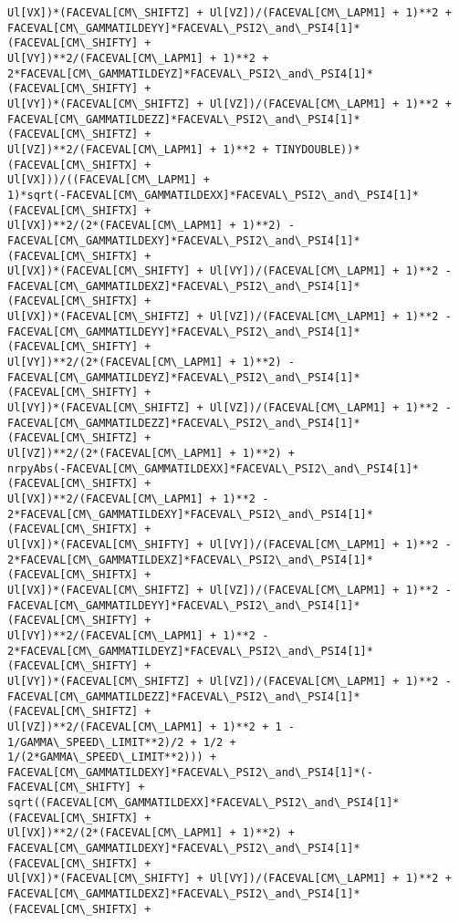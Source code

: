 \documentclass[landscape,letterpaper,10pt,english]{article}
\begin{document}
\begin{Verbatim}[commandchars=\\\{\}]
Ul[VX])*(FACEVAL[CM\_SHIFTZ] + Ul[VZ])/(FACEVAL[CM\_LAPM1] + 1)**2 +
FACEVAL[CM\_GAMMATILDEYY]*FACEVAL\_PSI2\_and\_PSI4[1]*(FACEVAL[CM\_SHIFTY] +
Ul[VY])**2/(FACEVAL[CM\_LAPM1] + 1)**2 +
2*FACEVAL[CM\_GAMMATILDEYZ]*FACEVAL\_PSI2\_and\_PSI4[1]*(FACEVAL[CM\_SHIFTY] +
Ul[VY])*(FACEVAL[CM\_SHIFTZ] + Ul[VZ])/(FACEVAL[CM\_LAPM1] + 1)**2 +
FACEVAL[CM\_GAMMATILDEZZ]*FACEVAL\_PSI2\_and\_PSI4[1]*(FACEVAL[CM\_SHIFTZ] +
Ul[VZ])**2/(FACEVAL[CM\_LAPM1] + 1)**2 + TINYDOUBLE))*(FACEVAL[CM\_SHIFTX] +
Ul[VX]))/((FACEVAL[CM\_LAPM1] +
1)*sqrt(-FACEVAL[CM\_GAMMATILDEXX]*FACEVAL\_PSI2\_and\_PSI4[1]*(FACEVAL[CM\_SHIFTX] +
Ul[VX])**2/(2*(FACEVAL[CM\_LAPM1] + 1)**2) -
FACEVAL[CM\_GAMMATILDEXY]*FACEVAL\_PSI2\_and\_PSI4[1]*(FACEVAL[CM\_SHIFTX] +
Ul[VX])*(FACEVAL[CM\_SHIFTY] + Ul[VY])/(FACEVAL[CM\_LAPM1] + 1)**2 -
FACEVAL[CM\_GAMMATILDEXZ]*FACEVAL\_PSI2\_and\_PSI4[1]*(FACEVAL[CM\_SHIFTX] +
Ul[VX])*(FACEVAL[CM\_SHIFTZ] + Ul[VZ])/(FACEVAL[CM\_LAPM1] + 1)**2 -
FACEVAL[CM\_GAMMATILDEYY]*FACEVAL\_PSI2\_and\_PSI4[1]*(FACEVAL[CM\_SHIFTY] +
Ul[VY])**2/(2*(FACEVAL[CM\_LAPM1] + 1)**2) -
FACEVAL[CM\_GAMMATILDEYZ]*FACEVAL\_PSI2\_and\_PSI4[1]*(FACEVAL[CM\_SHIFTY] +
Ul[VY])*(FACEVAL[CM\_SHIFTZ] + Ul[VZ])/(FACEVAL[CM\_LAPM1] + 1)**2 -
FACEVAL[CM\_GAMMATILDEZZ]*FACEVAL\_PSI2\_and\_PSI4[1]*(FACEVAL[CM\_SHIFTZ] +
Ul[VZ])**2/(2*(FACEVAL[CM\_LAPM1] + 1)**2) +
nrpyAbs(-FACEVAL[CM\_GAMMATILDEXX]*FACEVAL\_PSI2\_and\_PSI4[1]*(FACEVAL[CM\_SHIFTX] +
Ul[VX])**2/(FACEVAL[CM\_LAPM1] + 1)**2 -
2*FACEVAL[CM\_GAMMATILDEXY]*FACEVAL\_PSI2\_and\_PSI4[1]*(FACEVAL[CM\_SHIFTX] +
Ul[VX])*(FACEVAL[CM\_SHIFTY] + Ul[VY])/(FACEVAL[CM\_LAPM1] + 1)**2 -
2*FACEVAL[CM\_GAMMATILDEXZ]*FACEVAL\_PSI2\_and\_PSI4[1]*(FACEVAL[CM\_SHIFTX] +
Ul[VX])*(FACEVAL[CM\_SHIFTZ] + Ul[VZ])/(FACEVAL[CM\_LAPM1] + 1)**2 -
FACEVAL[CM\_GAMMATILDEYY]*FACEVAL\_PSI2\_and\_PSI4[1]*(FACEVAL[CM\_SHIFTY] +
Ul[VY])**2/(FACEVAL[CM\_LAPM1] + 1)**2 -
2*FACEVAL[CM\_GAMMATILDEYZ]*FACEVAL\_PSI2\_and\_PSI4[1]*(FACEVAL[CM\_SHIFTY] +
Ul[VY])*(FACEVAL[CM\_SHIFTZ] + Ul[VZ])/(FACEVAL[CM\_LAPM1] + 1)**2 -
FACEVAL[CM\_GAMMATILDEZZ]*FACEVAL\_PSI2\_and\_PSI4[1]*(FACEVAL[CM\_SHIFTZ] +
Ul[VZ])**2/(FACEVAL[CM\_LAPM1] + 1)**2 + 1 - 1/GAMMA\_SPEED\_LIMIT**2)/2 + 1/2 +
1/(2*GAMMA\_SPEED\_LIMIT**2))) +
FACEVAL[CM\_GAMMATILDEXY]*FACEVAL\_PSI2\_and\_PSI4[1]*(-FACEVAL[CM\_SHIFTY] +
sqrt((FACEVAL[CM\_GAMMATILDEXX]*FACEVAL\_PSI2\_and\_PSI4[1]*(FACEVAL[CM\_SHIFTX] +
Ul[VX])**2/(2*(FACEVAL[CM\_LAPM1] + 1)**2) +
FACEVAL[CM\_GAMMATILDEXY]*FACEVAL\_PSI2\_and\_PSI4[1]*(FACEVAL[CM\_SHIFTX] +
Ul[VX])*(FACEVAL[CM\_SHIFTY] + Ul[VY])/(FACEVAL[CM\_LAPM1] + 1)**2 +
FACEVAL[CM\_GAMMATILDEXZ]*FACEVAL\_PSI2\_and\_PSI4[1]*(FACEVAL[CM\_SHIFTX] +

\end{Verbatim}
\end{document}
